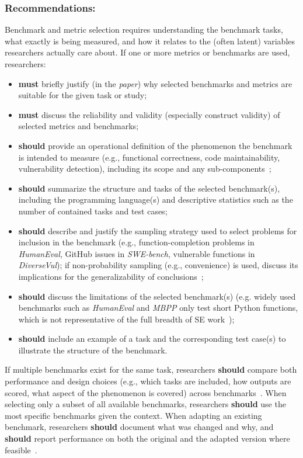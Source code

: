 \documentclass[smallextended]{svjour3}
\newcommand{\must}{\textbf{must}\xspace}
\newcommand{\should}{\textbf{should}\xspace}
\newcommand{\paper}{\emph{paper}\xspace}
\newcommand{\paper}{\emph{paper}\xspace}
\newcommand{\guidelinesubsubsection}[1]{\subsubsection{\bfseries #1:}}
\newcommand{\guidelinesubsubsection}[1]{\subsubsection{#1}}
\begin{document}
\guidelinesubsubsection{Recommendations}

Benchmark and metric selection requires understanding the benchmark tasks, what exactly is being measured, and how it relates to the (often latent) variables researchers actually care about. If one or more metrics or benchmarks are used, researchers:
\begin{itemize}
    \item \must briefly justify (in the \paper) why selected benchmarks and metrics are suitable for the given task or study;
    \item \must discuss the reliability and validity (especially construct validity) of selected metrics and benchmarks;
    \item \should provide an operational definition of the phenomenon the benchmark is intended to measure (e.g., functional correctness, code maintainability, vulnerability detection), including its scope and any sub-components~\cite{bean2025measuring};
    \item \should summarize the structure and tasks of the selected benchmark(s), including the programming language(s) and descriptive statistics such as the number of contained tasks and test cases;
    \item \should describe and justify the sampling strategy used to select problems for inclusion in the benchmark (e.g., function-completion problems in \emph{HumanEval}, GitHub issues in \emph{SWE-bench}, vulnerable functions in \emph{DiverseVul}); if non-probability sampling (e.g., convenience) is used, discuss its implications for the generalizability of conclusions~\cite{DBLP:journals/ese/BaltesR22, bean2025measuring};
    \item \should discuss the limitations of the selected benchmark(s) (e.g. widely used benchmarks such as \emph{HumanEval} \cite{DBLP:journals/corr/abs-2107-03374} and \emph{MBPP} \cite{DBLP:journals/corr/abs-2108-07732} only test short Python functions, which is not representative of the full breadth of SE work~\cite{Chandra2025benchmarks});
    \item \should include an example of a task and the corresponding test case(s) to illustrate the structure of the benchmark.
\end{itemize}

If multiple benchmarks exist for the same task, researchers \should compare both performance and design choices (e.g., which tasks are included, how outputs are scored, what aspect of the phenomenon is covered) across benchmarks~\cite{bean2025measuring}.
When selecting only a subset of all available benchmarks, researchers \should use the most specific benchmarks given the context.
When adapting an existing benchmark, researchers \should document what was changed and why, and \should report performance on both the original and the adapted version where feasible~\cite{bean2025measuring}.
\end{document}
